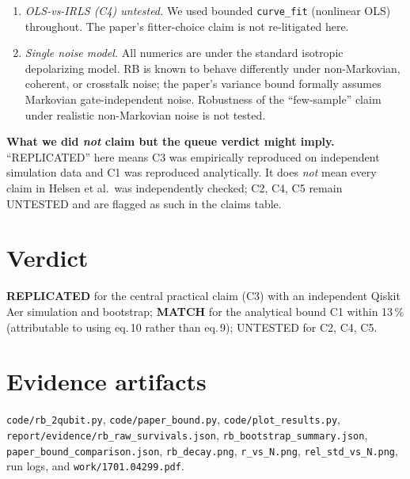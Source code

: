 \documentclass[11pt]{article}
\begin{document}
\begin{enumerate}
  claim --- that $N$ is essentially $q$-independent up to prefactors --- is
  \emph{spot-checked from Fig.\,2} rather than reproduced. Reproducing this
  would require evaluating eq.\,(11) across $q\in\{1,\dots,6\}$.
\item \emph{OLS-vs-IRLS (C4) untested.} We used bounded \texttt{curve\_fit}
  (nonlinear OLS) throughout. The paper's fitter-choice claim is not
  re-litigated here.
\item \emph{Single noise model.} All numerics are under the standard
  isotropic depolarizing model. RB is known to behave differently under
  non-Markovian, coherent, or crosstalk noise; the paper's variance bound
  formally assumes Markovian gate-independent noise. Robustness of the
  ``few-sample'' claim under realistic non-Markovian noise is not tested.
\end{enumerate}

\textbf{What we did \emph{not} claim but the queue verdict might imply.}
``REPLICATED'' here means C3 was empirically reproduced on independent
simulation data and C1 was reproduced analytically. It does \emph{not} mean
every claim in Helsen et al.\ was independently checked; C2, C4, C5 remain
UNTESTED and are flagged as such in the claims table.

\section{Verdict}
\textbf{REPLICATED} for the central practical claim (C3) with an independent
Qiskit Aer simulation and bootstrap; \textbf{MATCH} for the analytical
bound C1 within 13\,\% (attributable to using eq.\,10 rather than eq.\,9);
UNTESTED for C2, C4, C5.

\section{Evidence artifacts}
\texttt{code/rb\_2qubit.py}, \texttt{code/paper\_bound.py},
\texttt{code/plot\_results.py},
\texttt{report/evidence/rb\_raw\_survivals.json},
\texttt{rb\_bootstrap\_summary.json},
\texttt{paper\_bound\_comparison.json},
\texttt{rb\_decay.png}, \texttt{r\_vs\_N.png}, \texttt{rel\_std\_vs\_N.png},
run logs, and \texttt{work/1701.04299.pdf}.


\end{document}
